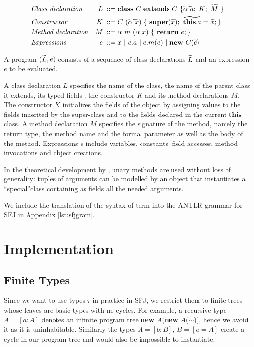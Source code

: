 \documentclass{l4proj}
\begin{document}
\begin{align*}
     & \mbox{\textit{Class declaration}}  & L \; ::= \; & \syndecl{C}{C}{\wt{\alpha \ a};\ K; \ \wt{M}\ }                         \\
     & \mbox{\textit{Constructor}}        & K \;::=\;   & C\ (\wt{\alpha\ x})\ \{\ \synsuper(\wt{x});\ \wt{\synthis.a}=\wt{x}; \} \\
     & \mbox{\textit{Method declaration}} & M \; ::= \; & \alpha \ m\ (\alpha \ x)\ \{\ \synret e; \}                             \\
     & \mbox{\textit{Expressions}}        & e \; ::=\;  & x\ |\ e.a\ |\ e.m(e) \ | \ \synnew C(\wt{e})
\end{align*}

A {program} $(\widetilde{L}, e)$ consists of a sequence of class declarations $\widetilde{L}$ and an expression $e$ to be evaluated.

A class declaration $L$ specifies the name of the class, the name of the parent class it extends, its typed fields , the constructor $K$ and its method declarations $M$.
The constructor $K$ initializes the fields of the object by assigning values to the fields inherited by the super-class and to the fields declared in the current \textbf{this} class.
A method declaration $M$ specifies the signature of the method, namely the return type, the method name and the formal parameter as well as the body of the method. Expressions $e$ include variables, constants, field accesses, method invocations and object creations.

In the theoretical development by \citet{Dardha2017}, unary methods are used without loss of generality: tuples of arguments can be modelled by an object that instantiates a ``special''class containing as fields all the needed arguments.

We include the translation of the syntax of term into the ANTLR grammar for SFJ in Appendix \ref{lst:sfjgram}.

\section{Implementation}

\subsection{Finite Types}

Since we want to use types $\tau$ in practice in SFJ, we restrict them to finite trees whose leaves are basic types with no cycles.
For example, a recursive type $A = [a : A]$ denotes an infinite program tree \textbf{new} ${A}$(\textbf{new} $A$($\cdots{}$)), hence we avoid it as it is uninhabitable.
Similarly the types $A = [b: B]$, $B = [a = A]$ create a cycle in our program tree and would also be impossible to instantiate.
\end{document}
